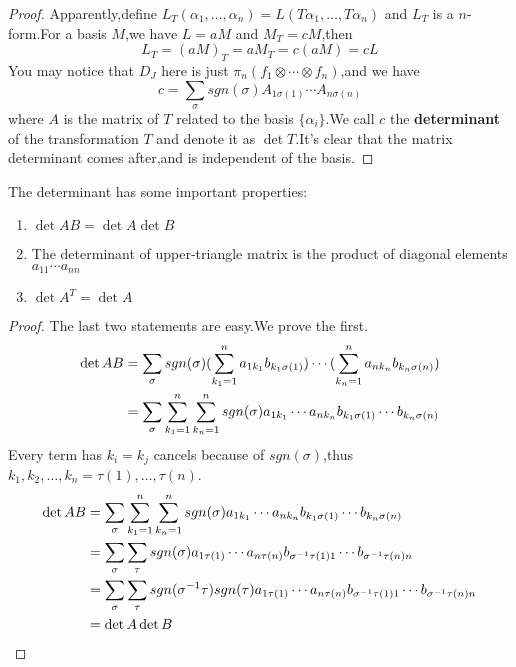 \documentclass{article}
\begin{document}
\begin{proof}
	Apparently,define $L_T(\alpha_1,\dots,\alpha_n)=L(T\alpha_1,\dots,T\alpha_n)$ and $L_T$ is a $n$-form.For a basis $M$,we have $L=aM$ and $M_T=cM$,then
	\[L_T=(aM)_T=aM_T=c(aM)=cL\]
	You may notice that $D_J$ here is just $\pi_n(f_{1}\otimes\cdots\otimes f_{n})$,and we have
	\[c=\sum\limits_\sigma sgn(\sigma)A_{1\sigma(1)}\cdots A_{n\sigma(n)}\]
	where $A$ is the matrix of $T$ related to the basis $\{\alpha_i\}$.We call $c$ the \textbf{determinant} of the transformation $T$ and denote it as $\det T$.It's clear that the matrix determinant comes after,and is independent of the basis.
\end{proof}
\begin{thm}
	The determinant has some important properties:
	\begin{enumerate}
		\item $\det AB=\det A\det B$
		\item The determinant of upper-triangle matrix is the product of diagonal elements $a_{11}\cdots a_{nn}$
		\item $\det A^T=\det A$
	\end{enumerate}
\end{thm}
\begin{proof}
	The last two statements are easy.We prove the first.
	\begin{align}
		\det AB&=\sum\limits_{\sigma}sgn(\sigma)(\sum\limits_{k_1=1}^na_{1k_1}b_{k_1\sigma(1)})\cdots(\sum\limits_{k_n=1}^na_{nk_n}b_{k_n\sigma(n)})\notag\\
		&=\sum\limits_{\sigma}\sum\limits_{k_1=1}^n\sum\limits_{k_n=1}^nsgn(\sigma)a_{1k_1}\cdots a_{nk_n}b_{k_1\sigma(1)}\cdots b_{k_n\sigma(n)}\notag
	\end{align}
	Every term has $k_i=k_j$ cancels because of $sgn(\sigma)$,thus $k_1,k_2,\dots,k_n=\tau(1),\dots,\tau(n)$.
	\begin{align}
		\det AB&=\sum\limits_{\sigma}\sum\limits_{k_1=1}^n\sum\limits_{k_n=1}^nsgn(\sigma)a_{1k_1}\cdots a_{nk_n}b_{k_1\sigma(1)}\cdots b_{k_n\sigma(n)}\notag\\
		&=\sum\limits_{\sigma}\sum\limits_{\tau}sgn(\sigma)a_{1\tau(1)}\cdots a_{n\tau(n)}b_{\sigma^{-1}\tau(1)1}\cdots b_{\sigma^{-1}\tau(n)n}\notag\\
		&=\sum\limits_{\sigma}\sum\limits_{\tau}sgn(\sigma^{-1}\tau)sgn(\tau)a_{1\tau(1)}\cdots a_{n\tau(n)}b_{\sigma^{-1}\tau(1)1}\cdots b_{\sigma^{-1}\tau(n)n}\notag\\
		&=\det A\det B\notag
	\end{align}
\end{proof}
\end{document}
